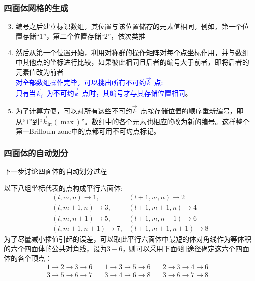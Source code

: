 \documentclass[cjk,slidestop,compress,mathserif,blue]{beamer}
\begin{document}
\frame
{
	\frametitle{四面体网格的生成}
\begin{enumerate}
	\setcounter{enumi}{2}
	\item 编号之后建立标识数组，其位置与该位置储存的元素值相同，例如，第一个位置存储“$1$”，第二个位置存储“$2$”，依次类推
	\item 然后从第一个位置开始，利用对称群的操作矩阵对每个点坐标作用，并与数组中其他点的坐标进行比较，如果彼此相同且后者的编号大于前者，即将后者的元素值改为前者\\\textcolor{blue}{对全部数组操作完毕，可以挑出所有不可约$\vec k$~点:\\只有当$\vec k_i$~为不可约$\vec k$~点时，其编号才与其存储位置相同}。
	\item 为了计算方便，可以对所有这些不可约$\vec k$~点按存储位置的顺序重新编号，即从“$1$”到“$\vec k_{\mathrm{irr}}(\max)$”。数组中的各个元素也相应的改为新的编号。这样整个第一\textrm{Brillouin-zone}中的点都可用不可约点标记。
\end{enumerate}
}

\frame
{
	\frametitle{四面体的自动划分}
下一步讨论四面体的自动划分过程

以下八组坐标代表的点构成平行六面体:
\begin{displaymath}
	\begin{aligned}
		&(l,m,n)\rightarrow 1,&(l+1,m,n)\rightarrow 2\\
		&(l,m+1,n)\rightarrow 3,&(l+1,m+1,n)\rightarrow 4\\
		&(l,m,n+1)\rightarrow 5,&(l+1,m,n+1)\rightarrow 6\\
		&(l,m+1,n+1)\rightarrow 7,&(l+1,m+1,n+1)\rightarrow 8
	\end{aligned}
\end{displaymath}
为了尽量减小插值引起的误差，可以取此平行六面体中最短的体对角线作为等体积的六个四面体的公共对角线，设为$3-6$，则可以采用下面6组途径确定这六个四面体的各个顶点：
\begin{displaymath}
	\begin{aligned}
		1\rightarrow2\rightarrow3\rightarrow6\quad&1\rightarrow3\rightarrow5\rightarrow6\quad&2\rightarrow3\rightarrow4\rightarrow6\\
		3\rightarrow5\rightarrow6\rightarrow7\quad&3\rightarrow4\rightarrow6\rightarrow8\quad&3\rightarrow6\rightarrow7\rightarrow8
	\end{aligned}
\end{displaymath}
}
\end{document}
